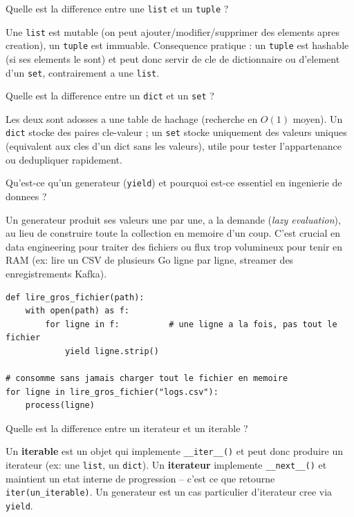 \documentclass[11pt,a4paper]{article}
\begin{document}
\begin{question} Quelle est la difference entre une \texttt{list} et un \texttt{tuple} ?
\end{question}
\begin{reponse}
Une \texttt{list} est mutable (on peut ajouter/modifier/supprimer des elements apres creation), un \texttt{tuple} est immuable. Consequence pratique : un \texttt{tuple} est hashable (si ses elements le sont) et peut donc servir de cle de dictionnaire ou d'element d'un \texttt{set}, contrairement a une \texttt{list}.
\end{reponse}

\begin{question} Quelle est la difference entre un \texttt{dict} et un \texttt{set} ?
\end{question}
\begin{reponse}
Les deux sont adosses a une table de hachage (recherche en $O(1)$ moyen). Un \texttt{dict} stocke des paires cle-valeur ; un \texttt{set} stocke uniquement des valeurs uniques (equivalent aux cles d'un dict sans les valeurs), utile pour tester l'appartenance ou dedupliquer rapidement.
\end{reponse}

\begin{question} Qu'est-ce qu'un generateur (\texttt{yield}) et pourquoi est-ce essentiel en ingenierie de donnees ?
\end{question}
\begin{reponse}
Un generateur produit ses valeurs une par une, a la demande (\emph{lazy evaluation}), au lieu de construire toute la collection en memoire d'un coup. C'est crucial en data engineering pour traiter des fichiers ou flux trop volumineux pour tenir en RAM (ex: lire un CSV de plusieurs Go ligne par ligne, streamer des enregistrements Kafka).
\end{reponse}

\begin{lstlisting}
def lire_gros_fichier(path):
    with open(path) as f:
        for ligne in f:          # une ligne a la fois, pas tout le fichier
            yield ligne.strip()

# consomme sans jamais charger tout le fichier en memoire
for ligne in lire_gros_fichier("logs.csv"):
    process(ligne)
\end{lstlisting}

\begin{question} Quelle est la difference entre un iterateur et un iterable ?
\end{question}
\begin{reponse}
Un \textbf{iterable} est un objet qui implemente \texttt{\_\_iter\_\_()} et peut donc produire un iterateur (ex: une \texttt{list}, un \texttt{dict}). Un \textbf{iterateur} implemente \texttt{\_\_next\_\_()} et maintient un etat interne de progression -- c'est ce que retourne \texttt{iter(un\_iterable)}. Un generateur est un cas particulier d'iterateur cree via \texttt{yield}.
\end{reponse}
\end{document}
